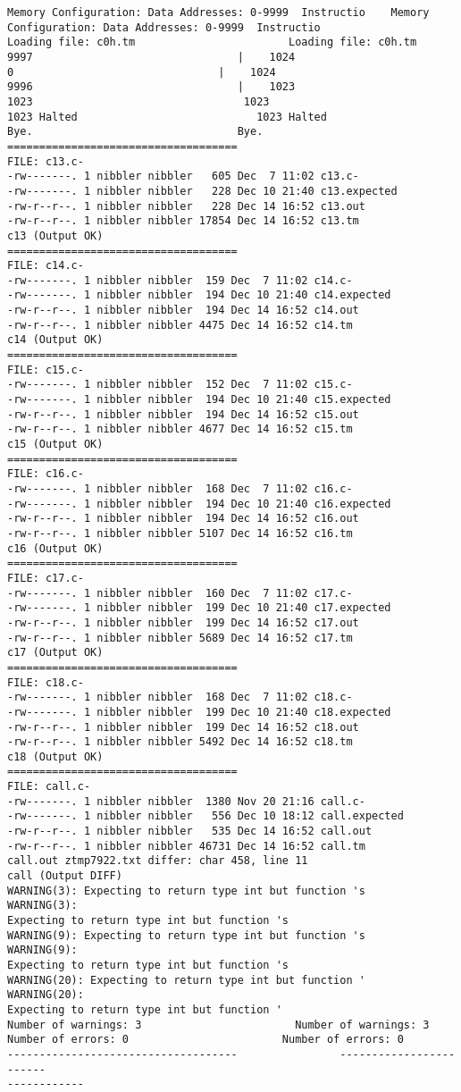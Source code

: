 \documentclass[12pt]{book}
\begin{document}
\begin{lstlisting}
Memory Configuration: Data Addresses: 0-9999  Instructio    Memory 
Configuration: Data Addresses: 0-9999  Instructio
Loading file: c0h.tm                        Loading file: c0h.tm
9997                                |    1024 
0                                |    1024 
9996                                |    1023 
1023                                 1023 
1023 Halted                            1023 Halted
Bye.                                Bye.
====================================
FILE: c13.c-
-rw-------. 1 nibbler nibbler   605 Dec  7 11:02 c13.c-
-rw-------. 1 nibbler nibbler   228 Dec 10 21:40 c13.expected
-rw-r--r--. 1 nibbler nibbler   228 Dec 14 16:52 c13.out
-rw-r--r--. 1 nibbler nibbler 17854 Dec 14 16:52 c13.tm
c13 (Output OK)
====================================
FILE: c14.c-
-rw-------. 1 nibbler nibbler  159 Dec  7 11:02 c14.c-
-rw-------. 1 nibbler nibbler  194 Dec 10 21:40 c14.expected
-rw-r--r--. 1 nibbler nibbler  194 Dec 14 16:52 c14.out
-rw-r--r--. 1 nibbler nibbler 4475 Dec 14 16:52 c14.tm
c14 (Output OK)
====================================
FILE: c15.c-
-rw-------. 1 nibbler nibbler  152 Dec  7 11:02 c15.c-
-rw-------. 1 nibbler nibbler  194 Dec 10 21:40 c15.expected
-rw-r--r--. 1 nibbler nibbler  194 Dec 14 16:52 c15.out
-rw-r--r--. 1 nibbler nibbler 4677 Dec 14 16:52 c15.tm
c15 (Output OK)
====================================
FILE: c16.c-
-rw-------. 1 nibbler nibbler  168 Dec  7 11:02 c16.c-
-rw-------. 1 nibbler nibbler  194 Dec 10 21:40 c16.expected
-rw-r--r--. 1 nibbler nibbler  194 Dec 14 16:52 c16.out
-rw-r--r--. 1 nibbler nibbler 5107 Dec 14 16:52 c16.tm
c16 (Output OK)
====================================
FILE: c17.c-
-rw-------. 1 nibbler nibbler  160 Dec  7 11:02 c17.c-
-rw-------. 1 nibbler nibbler  199 Dec 10 21:40 c17.expected
-rw-r--r--. 1 nibbler nibbler  199 Dec 14 16:52 c17.out
-rw-r--r--. 1 nibbler nibbler 5689 Dec 14 16:52 c17.tm
c17 (Output OK)
====================================
FILE: c18.c-
-rw-------. 1 nibbler nibbler  168 Dec  7 11:02 c18.c-
-rw-------. 1 nibbler nibbler  199 Dec 10 21:40 c18.expected
-rw-r--r--. 1 nibbler nibbler  199 Dec 14 16:52 c18.out
-rw-r--r--. 1 nibbler nibbler 5492 Dec 14 16:52 c18.tm
c18 (Output OK)
====================================
FILE: call.c-
-rw-------. 1 nibbler nibbler  1380 Nov 20 21:16 call.c-
-rw-------. 1 nibbler nibbler   556 Dec 10 18:12 call.expected
-rw-r--r--. 1 nibbler nibbler   535 Dec 14 16:52 call.out
-rw-r--r--. 1 nibbler nibbler 46731 Dec 14 16:52 call.tm
call.out ztmp7922.txt differ: char 458, line 11
call (Output DIFF)
WARNING(3): Expecting to return type int but function 's    WARNING(3): 
Expecting to return type int but function 's
WARNING(9): Expecting to return type int but function 's    WARNING(9): 
Expecting to return type int but function 's
WARNING(20): Expecting to return type int but function '    WARNING(20): 
Expecting to return type int but function '
Number of warnings: 3                        Number of warnings: 3
Number of errors: 0                        Number of errors: 0
------------------------------------                ------------------------
------------


\end{lstlisting}
\end{document}
